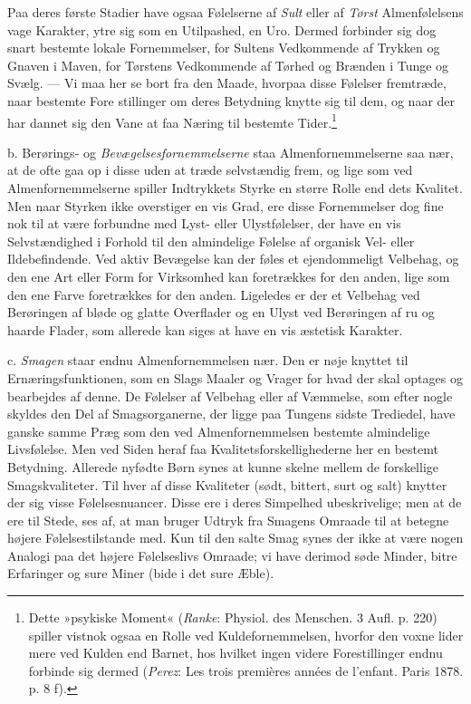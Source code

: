 \documentclass[12pt,a4paper,openany]{book}
\newcommand{\opage}[1]{\marginnote{\footnotesize\textit{[#1]}}}
\begin{document}
Paa deres første Stadier have ogsaa Følelserne af \emph{Sult} eller af
\emph{Tørst} Almenfølelsens vage Karakter, ytre sig som en Utilpashed,
en Uro. Dermed forbinder sig dog snart bestemte lokale Fornemmelser, for
Sultens Vedkommende af Trykken og Gnaven i Maven, for Tørstens
Vedkommende af Tørhed og Brænden i Tunge og Svælg. --- Vi maa her se
bort fra den Maade, hvorpaa disse Følelser fremtræde, naar bestemte
Fore%
\opage{275}stillinger om deres Betydning knytte sig til dem, og naar der
har dannet sig den Vane at faa Næring til bestemte
Tider.\footnote[1]{Dette »psykiske Moment« (\emph{Ranke}: Physiol. des
Menschen. 3 Aufl. p. 220) spiller vistnok ogsaa en Rolle ved
Kuldefornemmelsen, hvorfor den voxne lider mere ved Kulden end Barnet,
hos hvilket ingen videre Forestillinger endnu forbinde sig dermed
(\emph{Perez}: Les trois premières années de l’enfant. Paris 1878. p. 8
f).}

b. Berørings- og \emph{Bevægelsesfornemmelserne} staa
Almenfornemmelserne saa nær, at de ofte gaa op i disse uden at træde
selvstændig frem, og lige som ved Almenfornemmelserne spiller
Indtrykkets Styrke en større Rolle end dets Kvalitet. Men naar Styrken
ikke overstiger en vis Grad, ere disse Fornemmelser dog fine nok til at
være forbundne med Lyst- eller Ulystfølelser, der have en vis
Selvstændighed i Forhold til den almindelige Følelse af organisk Vel-
eller Ildebefindende. Ved aktiv Bevægelse kan der føles et ejendommeligt
Velbehag, og den ene Art eller Form for Virksomhed kan foretrækkes for
den anden, lige som den ene Farve foretrækkes for den anden. Ligeledes
er der et Velbehag ved Berøringen af bløde og glatte Overflader og en
Ulyst ved Berøringen af ru og haarde Flader, som allerede kan siges at
have en vis æstetisk Karakter.

c. \emph{Smagen} staar endnu Almenfornemmelsen nær. Den er nøje knyttet
til Ernæringsfunktionen, som en Slags Maaler og Vrager for hvad der skal
optages og bearbejdes af denne. De Følelser af Velbehag eller af
Væmmelse, som efter nogle skyldes den Del af Smagsorganerne, der ligge
paa Tungens sidste Trediedel, have ganske samme Præg som den ved
Almenfornemmelsen bestemte almindelige Livsfølelse. Men ved Siden heraf
faa Kvalitetsforskellighederne her en bestemt Betydning. Allerede
nyfødte Børn synes at kunne skelne mellem de forskellige
Smagskvaliteter. Til hver af disse Kvaliteter (sødt, bittert, surt og
salt) knytter der sig visse Følelsesnuancer. Disse ere i deres Simpelhed
ubeskrivelige; men at de ere til Stede, ses af, at man bruger Udtryk fra
Smagens Omraade til at betegne højere Følelsestilstande med. Kun til den
salte Smag synes der ikke at være nogen Analogi paa det
\opage{276}højere Følelseslivs Omraade; vi have derimod søde Minder,
bitre Erfaringer og sure Miner (bide i det sure Æble).
\end{document}
